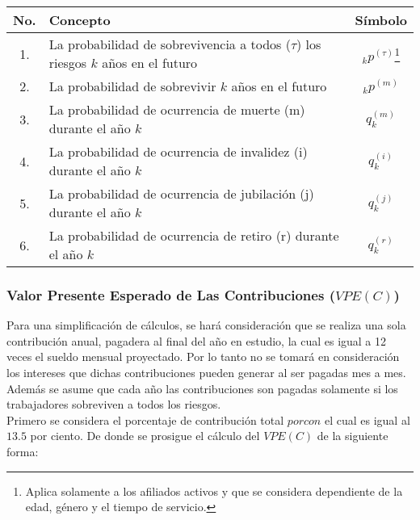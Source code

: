 \documentclass[12pt,letterpaper,titlepage]{article}
\begin{document}
{\begin{center}
	\begin{minipage}[t]{360pt} %
	\begin{tabular}{|c||p{9cm}||c|}
	\hline 
	\rule[-1ex]{0pt}{2.5ex} No. & Concepto & Símbolo \\ 
	\hline 
	\hline 
	\rule[-1ex]{0pt}{2.5ex} 1. & La probabilidad de sobrevivencia a todos ($\tau$) los riesgos $k$ años en el futuro  & $_{k}p^{(\tau)}$\footnote{Aplica solamente a los afiliados activos y que se considera dependiente de la edad, género y el tiempo de servicio.} \\ 
	\hline 
	\rule[-1ex]{0pt}{2.5ex} 2. & La probabilidad de sobrevivir $k$ años en el futuro & $_{k}p^{(m)}$ \\ 		\hline 
	\rule[-1ex]{0pt}{2.5ex} 3. & La probabilidad de ocurrencia de muerte (m) durante el año $k$ & $q_{k}^{(m)}$ \\ 
	\hline 
	\rule[-1ex]{0pt}{2.5ex} 4. & La probabilidad de ocurrencia de invalidez (i) durante el año $k$ & $q_{k}^{(i)}$ \\ 
	\hline 
	\rule[-1ex]{0pt}{2.5ex} 5. & La probabilidad de ocurrencia de jubilación (j) durante el año $k$ & $q_{k}^{(j)}$ \\ 
	\hline 
	\rule[-1ex]{0pt}{2.5ex} 6. & La probabilidad de ocurrencia de retiro (r) durante el año $k$ & $q_{k}^{(r)}$ \\ 
	\hline 
\end{tabular} 
\end{minipage}
\end{center}


\subsubsection{Valor Presente Esperado de Las Contribuciones ($V\!PE(C)$)}

Para una simplificación de cálculos, se hará consideración que se realiza una sola contribución anual, pagadera al final del año en estudio, la cual es igual a 12 veces el sueldo mensual proyectado. Por lo tanto no se tomará en consideración los intereses que dichas contribuciones pueden generar al ser pagadas mes a  mes. Además se asume que cada año las contribuciones son pagadas solamente si los trabajadores sobreviven a todos los riesgos.\\


Primero se considera el porcentaje de contribución total $porcon$ el cual es igual al $13.5$ por ciento. De donde se prosigue el cálculo del $V\!PE(C)$ de la siguiente forma:\\

}
\end{document}
